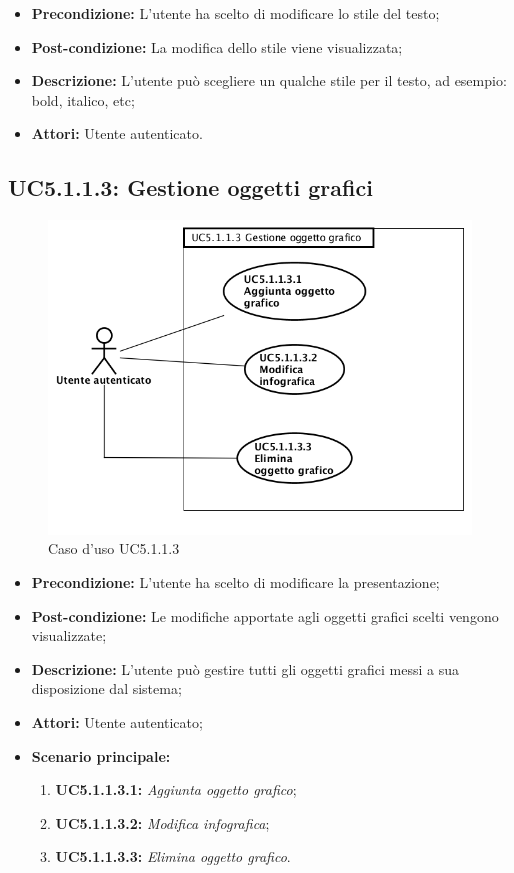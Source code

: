 \begin{itemize}
	\item \textbf{Precondizione:} L'utente ha scelto di modificare lo stile del testo;
	\item \textbf{Post-condizione:} La modifica dello stile viene visualizzata;
	\item \textbf{Descrizione:} L'utente può scegliere un qualche stile per il testo, ad esempio: bold, italico, etc;
	\item \textbf{Attori:} Utente autenticato.
\end{itemize}
\newpage
\subsection{ UC5.1.1.3: Gestione oggetti grafici}

\begin{figure}[h]
	\begin{center}
	\includegraphics[scale=0.4]{diagram/UC5-1-1-3.png}
	\caption{Caso d'uso UC5.1.1.3}
	\end{center}
\end{figure}
\begin{itemize}
	\item \textbf{Precondizione:} L'utente ha scelto di modificare la presentazione;
	\item \textbf{Post-condizione:} Le modifiche apportate agli oggetti grafici scelti vengono visualizzate;
	\item \textbf{Descrizione:} L'utente può gestire tutti gli oggetti grafici messi a sua disposizione dal sistema;
	\item \textbf{Attori:} Utente autenticato;
	\item \textbf{Scenario principale:}
	\begin{enumerate}
		\item \textbf{ UC5.1.1.3.1:} \textit{ Aggiunta oggetto grafico};
		\item \textbf{ UC5.1.1.3.2:} \textit{ Modifica infografica};
		\item \textbf{ UC5.1.1.3.3:} \textit{ Elimina oggetto grafico}.
	\end{enumerate}
\end{itemize}

